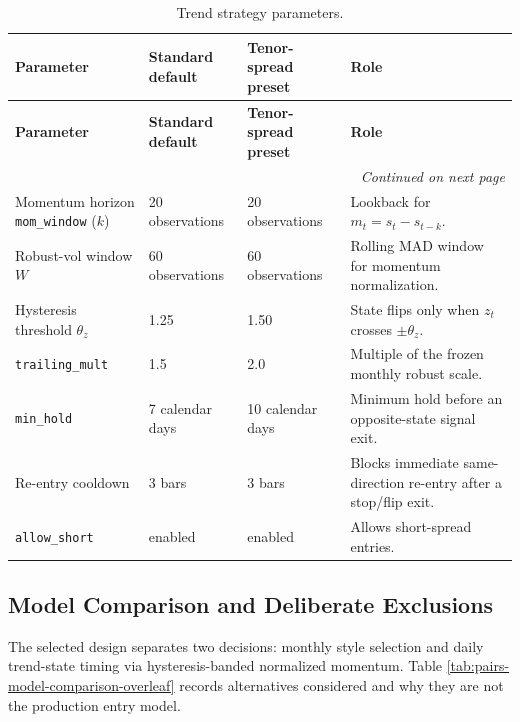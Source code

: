 {\small
\setlength{\LTleft}{0pt}
\setlength{\LTright}{0pt}
\setlength{\tabcolsep}{5pt}
\renewcommand{\arraystretch}{1.15}
\begin{longtable}{p{} p{} p{} p{}}
\caption{Trend strategy parameters.}\label{tab:pairs-trend-defaults-overleaf} \\
\toprule
\textbf{Parameter} & \textbf{Standard default} & \textbf{Tenor-spread preset} & \textbf{Role} \\
\midrule
\endfirsthead
\toprule
\textbf{Parameter} & \textbf{Standard default} & \textbf{Tenor-spread preset} & \textbf{Role} \\
\midrule
\endhead
\midrule
\multicolumn{4}{r}{\textit{Continued on next page}} \\
\midrule
\endfoot
\bottomrule
\endlastfoot
Momentum horizon \texttt{mom\_window} ($k$) & 20 observations & 20 observations & Lookback for $m_t=s_t-s_{t-k}$. \\
Robust-vol window $W$ & 60 observations & 60 observations & Rolling MAD window for momentum normalization. \\
Hysteresis threshold $\theta_z$ & 1.25 & 1.50 & State flips only when $z_t$ crosses $\pm\theta_z$. \\
\texttt{trailing\_mult} & 1.5 & 2.0 & Multiple of the frozen monthly robust scale. \\
\texttt{min\_hold} & 7 calendar days & 10 calendar days & Minimum hold before an opposite-state signal exit. \\
Re-entry cooldown & 3 bars & 3 bars & Blocks immediate same-direction re-entry after a stop/flip exit. \\
\texttt{allow\_short} & enabled & enabled & Allows short-spread entries. \\
\end{longtable}
}

\subsection{Model Comparison and Deliberate Exclusions}
\label{sec:pairs-model-comparison}

The selected design separates two decisions: monthly style selection and daily
trend-state timing via hysteresis-banded normalized momentum. Table
\ref{tab:pairs-model-comparison-overleaf} records alternatives considered and why they
are not the production entry model.

